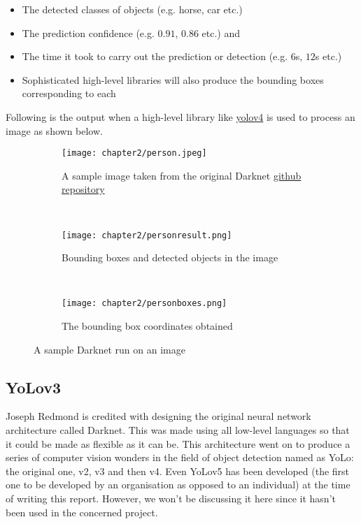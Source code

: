 \begin{itemize}
  \item The detected classes of objects (e.g. horse, car etc.)
  \item	The prediction confidence (e.g. $0.91$, $0.86$ etc.) and
  \item	The time it took to carry out the prediction or detection (e.g. $6$s, $12$s etc.)
  \item	Sophisticated high-level libraries will also produce the bounding boxes corresponding to each
\end{itemize}

\vspace{-0.1in}

Following is the output when a high-level library like \href{https://pypi.org/project/yolov4/}{yolov4} is used to process an image as shown below.

\begin{figure}[h]

\begin{center}
\begin{subfigure}{0.7\textwidth}
  \texttt{[image: chapter2/person.jpeg]}
  \caption{A sample image taken from the original Darknet \href{https://github.com/AlexeyAB/darknet}{github repository}}
  \label{fig:person_sub1}
 \end{subfigure} \\
 \begin{subfigure}{0.7\textwidth}
  \texttt{[image: chapter2/personresult.png]}
  \caption{Bounding boxes and detected objects in the image}
  \label{fig:person_sub2}
  \end{subfigure} \\
  \begin{subfigure}{0.7\textwidth}
   \texttt{[image: chapter2/personboxes.png]}
   \caption{The bounding box coordinates obtained}
   \label{fig:person_sub3}
 \end{subfigure}

 \caption{A sample Darknet run on an image}
 \label{fig:person_ref}

\end{center}

\end{figure}



\subsection{YoLov3}
Joseph Redmond is credited with designing the original neural network architecture called Darknet. This was made using all low-level languages so that it could be made as flexible as it can be. This architecture went on to produce a series of computer vision wonders in the field of object detection named as YoLo: the original one, v2, v3 and then v4. Even YoLov5 has been developed (the first one to be developed by an organisation as opposed to an individual) at the time of writing this report. However, we won’t be discussing it here since it hasn’t been used in the concerned project. \par

